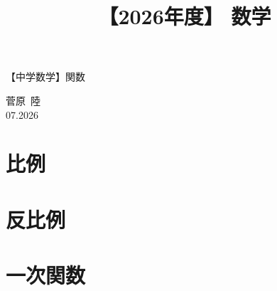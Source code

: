 \documentclass[12pt, a4paper]{jsarticle}
\title{【2026年度】 数学}
\author{}
\date{}
\begin{document}
\begin{center}
{\LARGE 【中学数学】関数}
\end{center}

\vspace{5mm}
\begin{flushright}
  菅原\ 陸\\[1.2em]
  07.2026
\end{flushright}

\setcounter{section}{-1}


\section{比例}

\setcounter{subsection}{0}


\section{反比例}



\section{一次関数}




% 

\bookletpadpages
\end{document}
